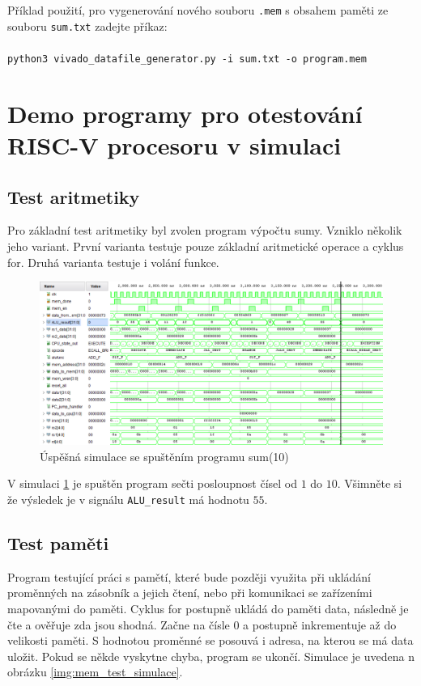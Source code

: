 \documentclass[FM,BP]{tulthesis}
\begin{document}
Příklad použití, pro vygenerování nového souboru \verb|.mem| s obsahem paměti ze souboru \verb|sum.txt| zadejte příkaz:

\paragraph{}
\verb|python3 vivado_datafile_generator.py -i sum.txt -o program.mem|

\section{Demo programy pro otestování RISC-V procesoru v simulaci}

\subsection{Test aritmetiky}
Pro základní test aritmetiky byl zvolen program výpočtu sumy. Vzniklo několik jeho variant. První varianta testuje pouze základní aritmetické operace a cyklus for. Druhá varianta testuje i volání funkce.

\begin{figure}[h]
    \centering
    \includegraphics[width=\textwidth]{assets/Program_sum(10).png}
    \caption{Úspěšná simulace se spuštěním programu sum(10)}
    \label{img:sum_simulace}
\end{figure}

V simulaci \ref{img:sum_simulace} je spuštěn program sečti posloupnost čísel od $1$ do $10$.
Všimněte si že výsledek je v signálu \verb|ALU_result| má hodnotu $55$.

\subsection{Test paměti}
Program testující práci s pamětí, které bude později využita při ukládání proměnných na zásobník a jejich čtení, nebo při komunikaci se zařízeními mapovanými do paměti. Cyklus for postupně ukládá do paměti data, následně je čte a ověřuje zda jsou shodná. Začne na čísle 0 a postupně inkrementuje až do velikosti paměti. S hodnotou proměnné se posouvá i adresa, na kterou se má data uložit. Pokud se někde vyskytne chyba, program se ukončí. Simulace je uvedena n obrázku \ref{img:mem_test_simulace}.
\end{document}
